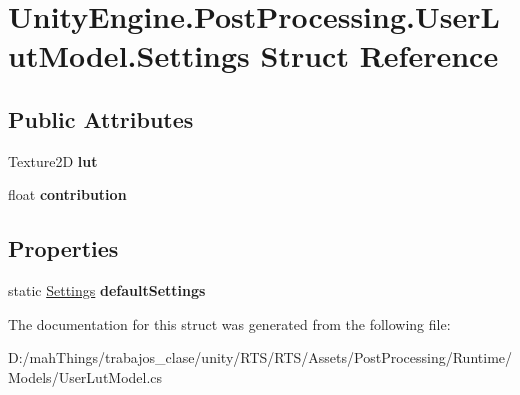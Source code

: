 \hypertarget{struct_unity_engine_1_1_post_processing_1_1_user_lut_model_1_1_settings}{}\section{Unity\+Engine.\+Post\+Processing.\+User\+Lut\+Model.\+Settings Struct Reference}
\label{struct_unity_engine_1_1_post_processing_1_1_user_lut_model_1_1_settings}
\subsection*{Public Attributes}
\begin{DoxyCompactItemize}
\item 
\mbox{\label{struct_unity_engine_1_1_post_processing_1_1_user_lut_model_1_1_settings_aacc55b006872312dfb56a19ec8b5e68a}} 
Texture2D {\bfseries lut}
\item 
\mbox{\label{struct_unity_engine_1_1_post_processing_1_1_user_lut_model_1_1_settings_aa1524dac501bc6c330d2e25298f1ddbd}} 
float {\bfseries contribution}
\end{DoxyCompactItemize}
\subsection*{Properties}
\begin{DoxyCompactItemize}
\item 
\mbox{\label{struct_unity_engine_1_1_post_processing_1_1_user_lut_model_1_1_settings_a9a4da996a1688ccaa11527b45937e91b}} 
static \mbox{\hyperlink{struct_unity_engine_1_1_post_processing_1_1_user_lut_model_1_1_settings}{Settings}} {\bfseries default\+Settings}
\end{DoxyCompactItemize}


The documentation for this struct was generated from the following file\+:\begin{DoxyCompactItemize}
\item 
D\+:/mah\+Things/trabajos\+\_\+clase/unity/\+R\+T\+S/\+R\+T\+S/\+Assets/\+Post\+Processing/\+Runtime/\+Models/User\+Lut\+Model.\+cs\end{DoxyCompactItemize}
